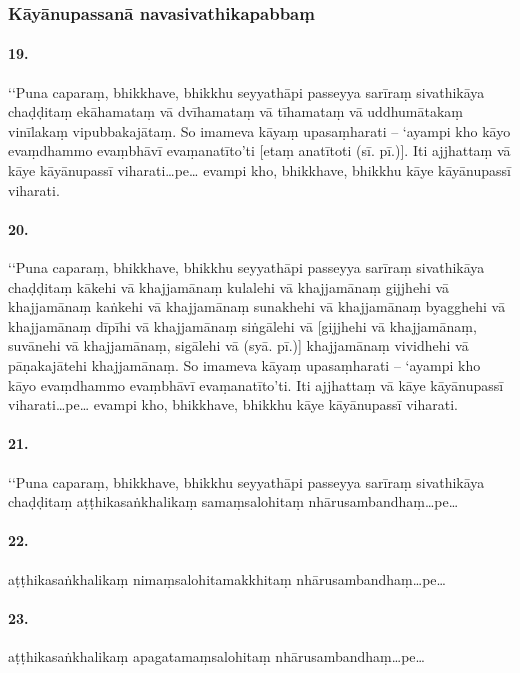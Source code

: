 
\subsubsection{Kāyānupassanā navasivathikapabbaṃ}

\paragraph{19.} ‘‘Puna caparaṃ, bhikkhave, bhikkhu seyyathāpi passeyya sarīraṃ sivathikāya chaḍḍitaṃ ekāhamataṃ vā dvīhamataṃ vā tīhamataṃ vā uddhumātakaṃ vinīlakaṃ vipubbakajātaṃ. So imameva kāyaṃ upasaṃharati – ‘ayampi kho kāyo evaṃdhammo evaṃbhāvī evaṃanatīto’ti [etaṃ anatītoti (sī. pī.)]. Iti ajjhattaṃ vā kāye kāyānupassī viharati…pe… evampi kho, bhikkhave, bhikkhu kāye kāyānupassī viharati.

\paragraph{20.} ‘‘Puna caparaṃ, bhikkhave, bhikkhu seyyathāpi passeyya sarīraṃ sivathikāya chaḍḍitaṃ kākehi vā khajjamānaṃ kulalehi vā khajjamānaṃ gijjhehi vā khajjamānaṃ kaṅkehi vā khajjamānaṃ sunakhehi vā khajjamānaṃ byagghehi vā khajjamānaṃ dīpīhi vā khajjamānaṃ siṅgālehi vā [gijjhehi vā khajjamānaṃ, suvānehi vā khajjamānaṃ, sigālehi vā (syā. pī.)] khajjamānaṃ vividhehi vā pāṇakajātehi khajjamānaṃ. So imameva kāyaṃ upasaṃharati – ‘ayampi kho kāyo evaṃdhammo evaṃbhāvī evaṃanatīto’ti. Iti ajjhattaṃ vā kāye kāyānupassī viharati…pe… evampi kho, bhikkhave, bhikkhu kāye kāyānupassī viharati.

\paragraph{21.} ‘‘Puna caparaṃ, bhikkhave, bhikkhu seyyathāpi passeyya sarīraṃ sivathikāya chaḍḍitaṃ aṭṭhikasaṅkhalikaṃ samaṃsalohitaṃ nhārusambandhaṃ…pe…

\paragraph{22.} aṭṭhikasaṅkhalikaṃ nimaṃsalohitamakkhitaṃ nhārusambandhaṃ…pe…

\paragraph{23.} aṭṭhikasaṅkhalikaṃ apagatamaṃsalohitaṃ nhārusambandhaṃ…pe…

